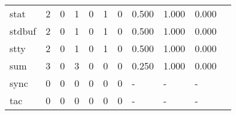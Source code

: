 \begin{longtable}{lp{1.2cm}p{1.2cm}p{1.2cm}p{1.2cm}p{1.2cm}p{1.2cm}p{1.2cm}p{1.2cm}p{1.2cm}p{1.2cm}}
stat      &                                     2 &                                                  0 &                                                1 &                                               0 &                                                1 &                                              0 &                                              0.500 &                                              1.000 &                                              0.000 \\
stdbuf    &                                     2 &                                                  0 &                                                1 &                                               0 &                                                1 &                                              0 &                                              0.500 &                                              1.000 &                                              0.000 \\
stty      &                                     2 &                                                  0 &                                                1 &                                               0 &                                                1 &                                              0 &                                              0.500 &                                              1.000 &                                              0.000 \\
sum       &                                     3 &                                                  0 &                                                3 &                                               0 &                                                0 &                                              0 &                                              0.250 &                                              1.000 &                                              0.000 \\
sync      &                                     0 &                                                  0 &                                                0 &                                               0 &                                                0 &                                              0 &                                                  - &                                                  - &                                                  - \\
tac       &                                     0 &                                                  0 &                                                0 &                                               0 &                                                0 &                                              0 &                                                  - &                                                  - &                                                  - \\

\end{longtable}
